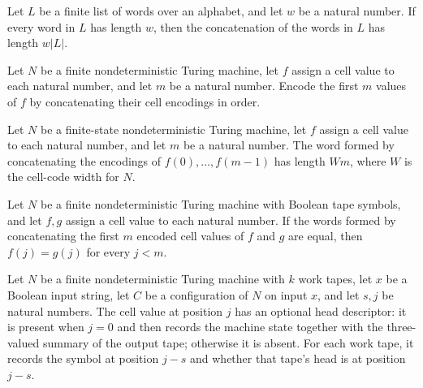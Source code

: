 \begin{lemma}
\label{Complexity.Codec.length_flatten_const}
\leanok
{}
Let $L$ be a finite list of words over an alphabet, and let $w$ be a natural number. If
every word in $L$ has length $w$, then the concatenation of the words in $L$ has length
$w|L|$.
\end{lemma}

\begin{definition}
\label{Complexity.Codec.chunksWord}
\leanok
{}
Let $N$ be a finite nondeterministic Turing machine, let $f$ assign a cell value to each
natural number, and let $m$ be a natural number. Encode the first $m$ values of $f$ by
concatenating their cell encodings in order.
\end{definition}

\begin{lemma}
\label{Complexity.Codec.length_chunksWord}
\leanok
{}
Let $N$ be a finite-state nondeterministic Turing machine, let $f$ assign a cell value
to each natural number, and let $m$ be a natural number. The word formed by
concatenating the encodings of $f(0),\ldots,f(m-1)$ has length $Wm$, where $W$ is the
cell-code width for $N$.
\end{lemma}

\begin{lemma}
\label{Complexity.Codec.chunksWord_inj}
\leanok
{}
Let $N$ be a finite nondeterministic Turing machine with Boolean tape symbols, and let
$f,g$ assign a cell value to each natural number. If the words formed by concatenating
the first $m$ encoded cell values of $f$ and $g$ are equal, then $f(j)=g(j)$ for every
$j<m$.
\end{lemma}

\begin{definition}
\label{Complexity.Codec.cellOf}
\leanok
{}
Let $N$ be a finite nondeterministic Turing machine with $k$ work tapes, let $x$ be a
Boolean input string, let $C$ be a configuration of $N$ on input $x$, and let $s,j$ be
natural numbers. The cell value at position $j$ has an optional head descriptor: it is
present when $j=0$ and then records the machine state together with the three-valued
summary of the output tape; otherwise it is absent. For each work tape, it records the
symbol at position $j-s$ and whether that tape's head is at position $j-s$.
\end{definition}

